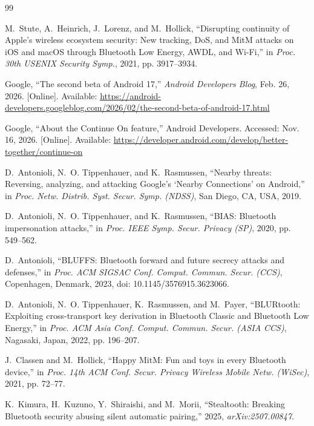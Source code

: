 \documentclass[conference]{IEEEtran}
\begin{document}
\begin{thebibliography}{99}

M.~Stute, A.~Heinrich, J.~Lorenz, and M.~Hollick, ``Disrupting continuity of Apple's wireless ecosystem security: New tracking, DoS, and MitM attacks on iOS and macOS through Bluetooth Low Energy, AWDL, and Wi-Fi,'' in \emph{Proc. 30th USENIX Security Symp.}, 2021, pp. 3917--3934.

Google, ``The second beta of Android 17,'' \emph{Android Developers Blog}, Feb. 26, 2026. [Online]. Available: \url{https://android-developers.googleblog.com/2026/02/the-second-beta-of-android-17.html}

Google, ``About the Continue On feature,'' Android Developers. Accessed: Nov. 16, 2026. [Online]. Available: \url{https://developer.android.com/develop/better-together/continue-on}

D.~Antonioli, N.~O. Tippenhauer, and K.~Rasmussen, ``Nearby threats: Reversing, analyzing, and attacking Google's `Nearby Connections' on Android,'' in \emph{Proc. Netw. Distrib. Syst. Secur. Symp. (NDSS)}, San Diego, CA, USA, 2019.

D.~Antonioli, N.~O. Tippenhauer, and K.~Rasmussen, ``BIAS: Bluetooth impersonation attacks,'' in \emph{Proc. IEEE Symp. Secur. Privacy (SP)}, 2020, pp. 549--562.

D.~Antonioli, ``BLUFFS: Bluetooth forward and future secrecy attacks and defenses,'' in \emph{Proc. ACM SIGSAC Conf. Comput. Commun. Secur. (CCS)}, Copenhagen, Denmark, 2023, doi: 10.1145/3576915.3623066.

D.~Antonioli, N.~O. Tippenhauer, K.~Rasmussen, and M.~Payer, ``BLURtooth: Exploiting cross-transport key derivation in Bluetooth Classic and Bluetooth Low Energy,'' in \emph{Proc. ACM Asia Conf. Comput. Commun. Secur. (ASIA CCS)}, Nagasaki, Japan, 2022, pp. 196--207.

J.~Classen and M.~Hollick, ``Happy MitM: Fun and toys in every Bluetooth device,'' in \emph{Proc. 14th ACM Conf. Secur. Privacy Wireless Mobile Netw. (WiSec)}, 2021, pp. 72--77.

K.~Kimura, H.~Kuzuno, Y.~Shiraishi, and M.~Morii, ``Stealtooth: Breaking Bluetooth security abusing silent automatic pairing,'' 2025, \emph{arXiv:2507.00847}.


\end{thebibliography}
\end{document}
